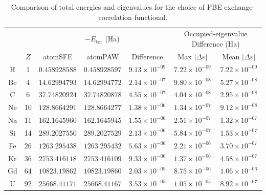 \begin{table}[!htbp]
    \centering
    \footnotesize
    \setlength{\tabcolsep}{3pt}
    \caption{Comparison of total energies and eigenvalues for the choice of PBE exchange-correlation functional.}
    \label{tab:ae-acc-pbe-rep10}
    \begin{tabular}{@{}c c ccc cc@{}}
        \toprule
        & & \multicolumn{3}{c}{$-E_{\mathrm{tot}}$ (Ha)} & \multicolumn{2}{c}{Occupied-eigenvalue Difference (Ha)} \\
        \cmidrule(lr){3-5} \cmidrule(lr){6-7}
        & $Z$ & atomSFE & atomPAW & Difference & Max $|\Delta \varepsilon|$ & Mean $|\Delta \varepsilon|$ \\
        \midrule
        H  &  1 & $0.458928588$   & $0.458928597$   & $9.13\times10^{-09}$ & $7.22\times10^{-09}$ & $7.22\times10^{-09}$ \\
        Be &  4 & $14.62994793$   & $14.62994772$   & $2.14\times10^{-07}$ & $9.80\times10^{-08}$ & $5.27\times10^{-08}$ \\
        C  &  6 & $37.74820924$   & $37.74820878$   & $4.55\times10^{-07}$ & $4.04\times10^{-08}$ & $2.95\times10^{-08}$ \\
        Ne & 10 & $128.8664291$   & $128.8664277$   & $1.38\times10^{-06}$ & $1.34\times10^{-07}$ & $9.12\times10^{-08}$ \\
        Na & 11 & $162.1645960$   & $162.1645945$   & $1.55\times10^{-06}$ & $2.51\times10^{-07}$ & $1.32\times10^{-07}$ \\
        Si & 14 & $289.2027550$   & $289.2027529$   & $2.13\times10^{-06}$ & $5.84\times10^{-07}$ & $1.53\times10^{-07}$ \\
        Fe & 26 & $1263.295438$   & $1263.295432$   & $5.63\times10^{-06}$ & $2.21\times10^{-06}$ & $3.70\times10^{-07}$ \\
        Kr & 36 & $2753.416118$   & $2753.416109$   & $9.33\times10^{-06}$ & $1.37\times10^{-06}$ & $4.58\times10^{-07}$ \\
        Gd & 64 & $10823.19862$   & $10823.19860$   & $2.03\times10^{-05}$ & $8.75\times10^{-06}$ & $1.06\times10^{-06}$ \\
        U  & 92 & $25668.41171$   & $25668.41167$   & $3.53\times10^{-05}$ & $1.05\times10^{-05}$ & $8.92\times10^{-07}$ \\
        \bottomrule
    \end{tabular}
\end{table}

